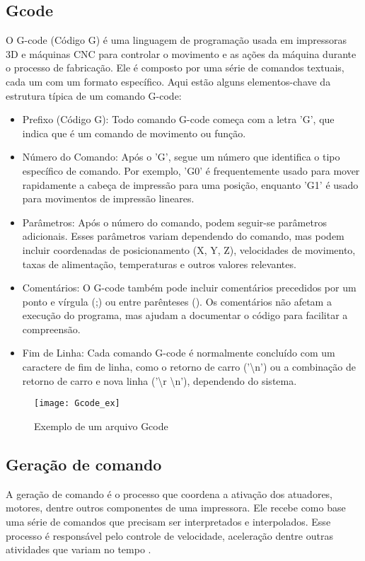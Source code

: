 \subsection{Gcode}

O G-code (Código G) é uma linguagem de programação usada em impressoras 3D e máquinas CNC para controlar o movimento e as ações da máquina durante o processo de fabricação. Ele é composto por uma série de comandos textuais, cada um com um formato específico. Aqui estão alguns elementos-chave da estrutura típica de um comando G-code:

\begin{itemize}
    \item Prefixo (Código G): Todo comando G-code começa com a letra 'G', que indica que é um comando de movimento ou função.
    \item Número do Comando: Após o 'G', segue um número que identifica o tipo específico de comando. Por exemplo, 'G0' é frequentemente usado para mover rapidamente a cabeça de impressão para uma posição, enquanto 'G1' é usado para movimentos de impressão lineares.
    \item Parâmetros: Após o número do comando, podem seguir-se parâmetros adicionais. Esses parâmetros variam dependendo do comando, mas podem incluir coordenadas de posicionamento (X, Y, Z), velocidades de movimento, taxas de alimentação, temperaturas e outros valores relevantes.
    \item Comentários: O G-code também pode incluir comentários precedidos por um ponto e vírgula (;) ou entre parênteses (). Os comentários não afetam a execução do programa, mas ajudam a documentar o código para facilitar a compreensão.
    \item Fim de Linha: Cada comando G-code é normalmente concluído com um caractere de fim de linha, como o retorno de carro ('\textbackslash n') ou a combinação de retorno de carro e nova linha ('\textbackslash r \textbackslash n'), dependendo do sistema.
\end{itemize}

\begin{figure}[H]
    \centering
    \caption{Exemplo de um arquivo Gcode}
    \texttt{[image: Gcode\_ex]}
    \label{fig:gcode_ex}
\end{figure}

\subsection{Geração de comando}
A geração de comando é o processo que coordena a ativação dos 
atuadores, motores, dentre outros componentes de uma impressora. 
Ele recebe como base uma série de comandos que precisam ser 
interpretados e interpolados. Esse processo é responsável pelo 
controle de velocidade, aceleração dentre outras atividades que 
variam no tempo \cite{yu20}. 

